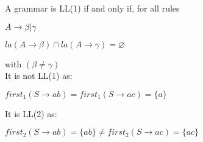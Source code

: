\noindent A grammar is LL(1) if and only if, for all rules 
\begin{center}
    $A \rightarrow \beta | \gamma $ 
    
    $la(A \rightarrow \beta) \cap la(A \rightarrow \gamma) = \varnothing$
\end{center}
with $(\beta \ne \gamma)$  \\

\noindent It is not LL(1) as:
\begin{center}
    $first_{1}(S \rightarrow ab) = first_{1}(S \rightarrow ac) = \{a\}$
\end{center}

\noindent It is LL(2) as:
\begin{center}
    $first_{2}(S \rightarrow ab) = \{ab\} \ne first_{2}(S \rightarrow ac) = \{ac\}$
\end{center}